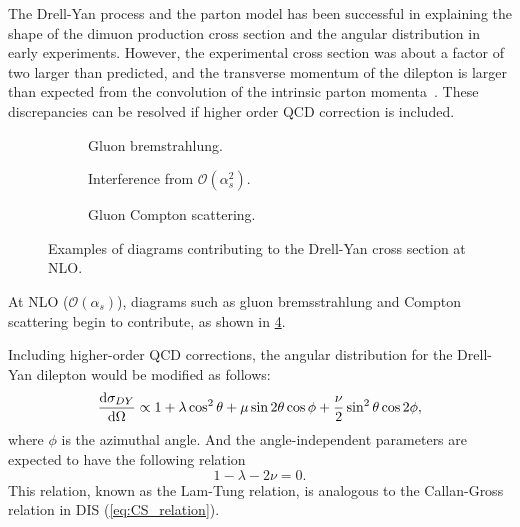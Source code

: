 \documentclass[../main.tex]{subfiles}
\begin{document}
The Drell-Yan process and the parton model has been successful in explaining the shape of
the dimuon production cross section and the angular distribution in early experiments. However,
the  experimental cross section was about a factor of two larger than predicted, and the
transverse momentum of the dilepton is larger than expected from the convolution of the intrinsic
parton momenta~\cite{mcgaughey1999}. These discrepancies can be resolved if higher order
QCD correction is included.
\begin{figure}[htbp!]
	\centering
	\begin{subfigure}{0.45\linewidth}
		\centering
		
		\caption{Gluon bremstrahlung.}
		\label{subfig:DY_gb}
	\end{subfigure}
	\begin{subfigure}{0.45\linewidth}
		\centering
		
		\caption{Interference from $\mathcal{O}(\alpha^2_s)$.}
		\label{subfig:DY_interfer}
	\end{subfigure}

	\begin{subfigure}{\linewidth}
		\centering
		\begin{subfigure}{0.45\linewidth}
			\centering
			
		\end{subfigure}
		\begin{subfigure}{0.45\linewidth}
			\centering
			
		\end{subfigure}
		\caption{Gluon Compton scattering.}
		\label{subfig:DY_gc}
	\end{subfigure}
	\caption{Examples of diagrams contributing to the Drell-Yan cross section
		at NLO.}
	\label{fig:NLO_DY}
\end{figure}
At NLO ($\mathcal{O}\left(\alpha_s\right)$), diagrams such as gluon bremsstrahlung
and Compton scattering begin to contribute, as shown in \cref{fig:NLO_DY}.



Including higher-order QCD corrections, the angular distribution for the Drell-Yan dilepton would
be modified as follows:
\begin{equation}
	\dv{\sigma_{DY}}{\Omega} \propto 1 + \lambda \cos^2\theta + \mu \sin 2\theta\cos\phi +\frac{\nu}{2}\sin^2\theta\cos 2\phi,
\end{equation}
where $\phi$ is the azimuthal angle. And the angle-independent parameters are expected to have the
following relation~\cite{lam1980}
\begin{equation}
	1-\lambda-2\nu=0.
\end{equation}
This relation, known as the Lam-Tung relation, is analogous to the Callan-Gross relation in DIS
(\cref{eq:CS_relation}).
\end{document}
